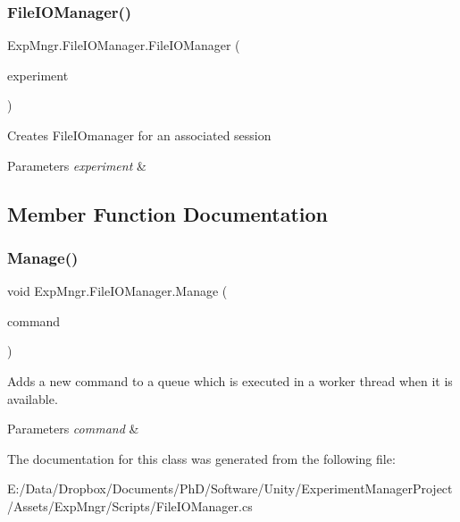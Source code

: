 \subsubsection{\texorpdfstring{File\+I\+O\+Manager()}{FileIOManager()}}
{\footnotesize\ttfamily Exp\+Mngr.\+File\+I\+O\+Manager.\+File\+I\+O\+Manager (\begin{DoxyParamCaption}\item[{\hyperlink{class_exp_mngr_1_1_experiment_session}{Experiment\+Session}}]{experiment }\end{DoxyParamCaption})}



Creates File\+I\+Omanager for an associated session 


\begin{DoxyParams}{Parameters}
{\em experiment} & \\
\hline
\end{DoxyParams}


\subsection{Member Function Documentation}
\mbox{\label{class_exp_mngr_1_1_file_i_o_manager_ad5fd364f256d4a9660cc544760371c6a}} 
\subsubsection{\texorpdfstring{Manage()}{Manage()}}
{\footnotesize\ttfamily void Exp\+Mngr.\+File\+I\+O\+Manager.\+Manage (\begin{DoxyParamCaption}\item[{\hyperlink{class_exp_mngr_1_1_file_i_o_command}{File\+I\+O\+Command}}]{command }\end{DoxyParamCaption})}



Adds a new command to a queue which is executed in a worker thread when it is available. 


\begin{DoxyParams}{Parameters}
{\em command} & \\
\hline
\end{DoxyParams}


The documentation for this class was generated from the following file\+:\begin{DoxyCompactItemize}
\item 
E\+:/\+Data/\+Dropbox/\+Documents/\+Ph\+D/\+Software/\+Unity/\+Experiment\+Manager\+Project/\+Assets/\+Exp\+Mngr/\+Scripts/File\+I\+O\+Manager.\+cs\end{DoxyCompactItemize}
